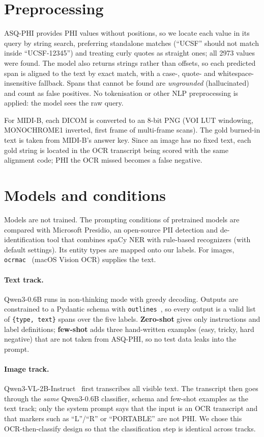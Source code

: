 \documentclass[11pt,a4paper]{article}
\begin{document}
\section{Preprocessing}

ASQ-PHI provides PHI values without positions, so we locate each value in its query by string search, preferring standalone matches (``UCSF'' should not match inside ``UCSF-12345'') and treating curly quotes as straight ones; all 2973 values were found. The model also returns strings rather than offsets, so each predicted span is aligned to the text by exact match, with a case-, quote- and whitespace-insensitive fallback. Spans that cannot be found are \emph{ungrounded} (hallucinated) and count as false positives. No tokenisation or other NLP preprocessing is applied: the model sees the raw query.

For MIDI-B, each DICOM is converted to an 8-bit PNG (VOI LUT windowing, MONOCHROME1 inverted, first frame of multi-frame scans). The gold burned-in text is taken from MIDI-B's answer key. Since an image has no fixed text, each gold string is located in the OCR transcript being scored with the same alignment code; PHI the OCR missed becomes a false negative.

\section{Models and conditions}

Models are not trained. The prompting conditions of pretrained models are compared with Microsoft Presidio, an open-source PII detection and de-identification tool that combines spaCy NER with rule-based recognizers (with default settings). Its entity types are mapped onto our labels. For images, \texttt{ocrmac}~\cite{ocrmac} (macOS Vision OCR) supplies the text.

\paragraph{Text track.} Qwen3-0.6B runs in non-thinking mode with greedy decoding. Outputs are constrained to a Pydantic schema with \texttt{outlines}~\cite{outlines}, so every output is a valid list of \texttt{\{type, text\}} spans over the five labels. \textbf{Zero-shot} gives only instructions and label definitions; \textbf{few-shot} adds three hand-written examples (easy, tricky, hard negative) that are not taken from ASQ-PHI, so no test data leaks into the prompt.

\paragraph{Image track.} Qwen3-VL-2B-Instruct~\cite{qwen3vl} first transcribes all visible text. The transcript then goes through the \emph{same} Qwen3-0.6B classifier, schema and few-shot examples as the text track; only the system prompt says that the input is an OCR transcript and that markers such as ``L''/``R'' or ``PORTABLE'' are not PHI. We chose this OCR-then-classify design so that the classification step is identical across tracks.
 
\end{document}

